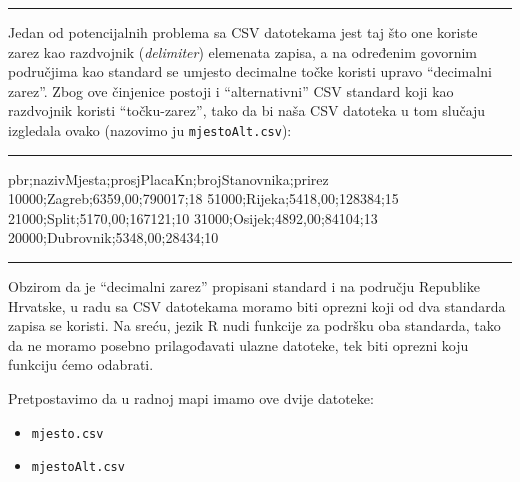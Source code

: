 \documentclass[]{book}
\newenvironment{Shaded}{\begin{snugshade}}{\end{snugshade}}
\newcommand{\DecValTok}[1]{\textcolor[rgb]{0.00,0.00,0.81}{#1}}
\newcommand{\NormalTok}[1]{#1}
\providecommand{\tightlist}{%
  \setlength{\itemsep}{0pt}\setlength{\parskip}{0pt}}
\theoremstyle{definition}
\theoremstyle{definition}
\theoremstyle{definition}
\theoremstyle{remark}
\begin{document}
\begin{center}\rule{0.5\linewidth}{\linethickness}\end{center}

Jedan od potencijalnih problema sa CSV datotekama jest taj što one
koriste zarez kao razdvojnik (\emph{delimiter}) elemenata zapisa, a na
određenim govornim područjima kao standard se umjesto decimalne točke
koristi upravo ``decimalni zarez''. Zbog ove činjenice postoji i
``alternativni'' CSV standard koji kao razdvojnik koristi
``točku-zarez'', tako da bi naša CSV datoteka u tom slučaju izgledala
ovako (nazovimo ju \texttt{mjestoAlt.csv}):

\begin{center}\rule{0.5\linewidth}{\linethickness}\end{center}

\begin{Shaded}
\begin{Highlighting}[]
\NormalTok{pbr;nazivMjesta;prosjPlacaKn;brojStanovnika;prirez}
\DecValTok{10000}\NormalTok{;Zagreb;}\DecValTok{6359}\NormalTok{,}\DecValTok{00}\NormalTok{;}\DecValTok{790017}\NormalTok{;}\DecValTok{18} 
\DecValTok{51000}\NormalTok{;Rijeka;}\DecValTok{5418}\NormalTok{,}\DecValTok{00}\NormalTok{;}\DecValTok{128384}\NormalTok{;}\DecValTok{15}
\DecValTok{21000}\NormalTok{;Split;}\DecValTok{5170}\NormalTok{,}\DecValTok{00}\NormalTok{;}\DecValTok{167121}\NormalTok{;}\DecValTok{10}
\DecValTok{31000}\NormalTok{;Osijek;}\DecValTok{4892}\NormalTok{,}\DecValTok{00}\NormalTok{;}\DecValTok{84104}\NormalTok{;}\DecValTok{13} 
\DecValTok{20000}\NormalTok{;Dubrovnik;}\DecValTok{5348}\NormalTok{,}\DecValTok{00}\NormalTok{;}\DecValTok{28434}\NormalTok{;}\DecValTok{10}
\end{Highlighting}
\end{Shaded}

\begin{center}\rule{0.5\linewidth}{\linethickness}\end{center}

Obzirom da je ``decimalni zarez'' propisani standard i na području
Republike Hrvatske, u radu sa CSV datotekama moramo biti oprezni koji od
dva standarda zapisa se koristi. Na sreću, jezik R nudi funkcije za
podršku oba standarda, tako da ne moramo posebno prilagođavati ulazne
datoteke, tek biti oprezni koju funkciju ćemo odabrati.

Pretpostavimo da u radnoj mapi imamo ove dvije datoteke:

\begin{itemize}
\tightlist
\item
  \texttt{mjesto.csv}
\item
  \texttt{mjestoAlt.csv}
\end{itemize}
\end{document}
